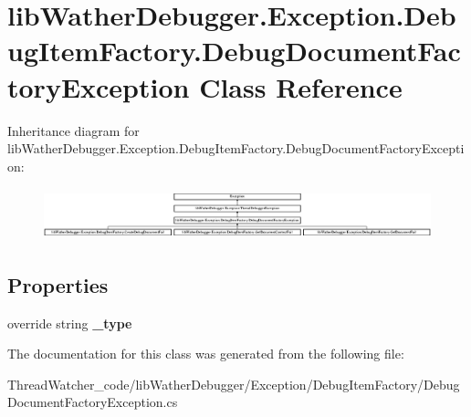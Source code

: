 \hypertarget{classlib_wather_debugger_1_1_exception_1_1_debug_item_factory_1_1_debug_document_factory_exception}{\section{lib\+Wather\+Debugger.\+Exception.\+Debug\+Item\+Factory.\+Debug\+Document\+Factory\+Exception Class Reference}
\label{classlib_wather_debugger_1_1_exception_1_1_debug_item_factory_1_1_debug_document_factory_exception}
}
Inheritance diagram for lib\+Wather\+Debugger.\+Exception.\+Debug\+Item\+Factory.\+Debug\+Document\+Factory\+Exception\+:\begin{figure}[H]
\begin{center}
\leavevmode
\includegraphics[height=1.520706cm]{classlib_wather_debugger_1_1_exception_1_1_debug_item_factory_1_1_debug_document_factory_exception}
\end{center}
\end{figure}
\subsection*{Properties}
\begin{DoxyCompactItemize}
\item 
\hypertarget{classlib_wather_debugger_1_1_exception_1_1_debug_item_factory_1_1_debug_document_factory_exception_a731ee0916c559069ee1eeba7e35d0e6d}{override string {\bfseries \+\_\+type}}\label{classlib_wather_debugger_1_1_exception_1_1_debug_item_factory_1_1_debug_document_factory_exception_a731ee0916c559069ee1eeba7e35d0e6d}

\end{DoxyCompactItemize}


The documentation for this class was generated from the following file\+:\begin{DoxyCompactItemize}
\item 
Thread\+Watcher\+\_\+code/lib\+Wather\+Debugger/\+Exception/\+Debug\+Item\+Factory/Debug\+Document\+Factory\+Exception.\+cs\end{DoxyCompactItemize}
